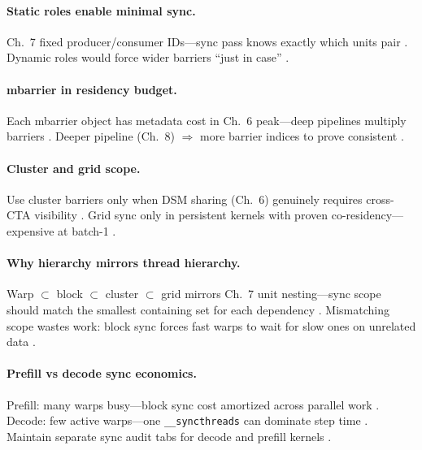 \paragraph{Static roles enable minimal sync.}
Ch.~7 fixed producer/consumer IDs---sync pass knows exactly which units pair \citep{yirage2026,shah2024flashattention3,mpk2025}.
Dynamic roles would force wider barriers ``just in case'' \citep{taxbreak2026,patel2025llminference}.

\paragraph{mbarrier in residency budget.}
Each mbarrier object has metadata cost in Ch.~6 peak---deep pipelines multiply barriers \citep{memoryfloor2026,chen2020compilerbasedhardw,yirage2026}.
Deeper pipeline (Ch.~8) $\Rightarrow$ more barrier indices to prove consistent \citep{wu2024mirage,shah2024flashattention3}.

\paragraph{Cluster and grid scope.}
Use cluster barriers only when DSM sharing (Ch.~6) genuinely requires cross-CTA visibility \citep{nvidia2022hopper,shah2024flashattention3}.
Grid sync only in persistent kernels with proven co-residency---expensive at batch-1 \citep{mpk2025,patel2025llminference,nvidia2024cudagraphs}.

\paragraph{Why hierarchy mirrors thread hierarchy.}
Warp $\subset$ block $\subset$ cluster $\subset$ grid mirrors Ch.~7 unit nesting---sync scope should match the smallest containing set for each dependency \citep{shah2024flashattention3,nvidia2022hopper,yirage2026}.
Mismatching scope wastes work: block sync forces fast warps to wait for slow ones on unrelated data \citep{patel2025llminference,memoryfloor2026,taxbreak2026}.

\paragraph{Prefill vs decode sync economics.}
Prefill: many warps busy---block sync cost amortized across parallel work \citep{kwon2023vllm,shah2024flashattention3}.
Decode: few active warps---one \texttt{\_\_syncthreads} can dominate step time \citep{patel2025llminference,taxbreak2026,memoryfloor2026}.
Maintain separate sync audit tabs for decode and prefill kernels \citep{yirage2026,chen2020compilerbasedhardw}.

